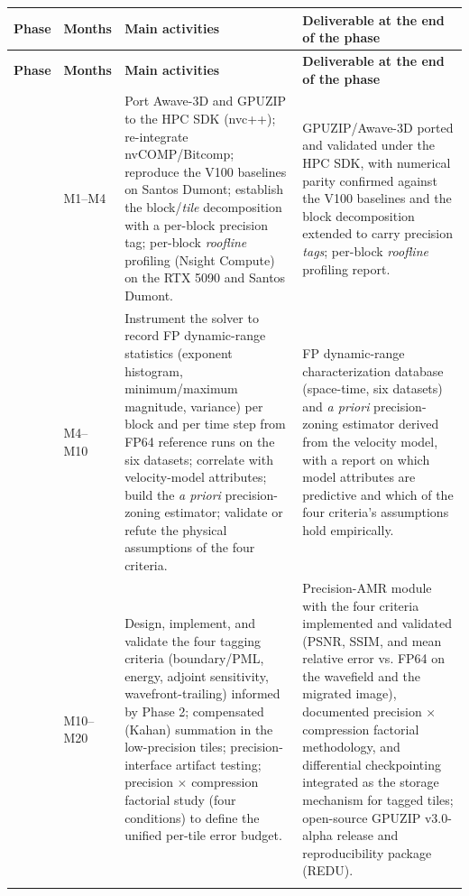 \documentclass[12pt,a4paper]{article}
\begin{document}
\begin{longtable}{@{}p{}p{}p{}p{}@{}}
\toprule
\textbf{Phase} & \textbf{Months} & \textbf{Main activities} &
\textbf{Deliverable at the end of the phase}\\
\midrule
\endfirsthead
\toprule
\textbf{Phase} & \textbf{Months} & \textbf{Main activities} &
\textbf{Deliverable at the end of the phase}\\
\midrule
\endhead
\bottomrule
\endfoot
1 & M1--M4 & Port Awave-3D and GPUZIP to the HPC SDK (nvc++); re-integrate
nvCOMP/Bitcomp; reproduce the V100 baselines on Santos Dumont; establish
the block/\emph{tile} decomposition with a per-block precision tag;
per-block \emph{roofline} profiling (Nsight Compute) on the RTX 5090 and
Santos Dumont. & GPUZIP/Awave-3D ported and validated under the HPC SDK,
with numerical parity confirmed against the V100 baselines and the block
decomposition extended to carry precision \emph{tags}; per-block
\emph{roofline} profiling report.\\
\addlinespace
2 & M4--M10 & Instrument the solver to record FP dynamic-range statistics
(exponent histogram, minimum/maximum magnitude, variance) per block and
per time step from FP64 reference runs on the six datasets; correlate with
velocity-model attributes; build the \emph{a priori} precision-zoning
estimator; validate or refute the physical assumptions of the four
criteria. & FP dynamic-range characterization database (space-time, six
datasets) and \emph{a priori} precision-zoning estimator derived from the
velocity model, with a report on which model attributes are predictive and
which of the four criteria's assumptions hold empirically.\\
\addlinespace
3 & M10--M20 & Design, implement, and validate the four tagging criteria
(boundary/PML, energy, adjoint sensitivity, wavefront-trailing) informed
by Phase 2; compensated (Kahan) summation in the low-precision tiles;
precision-interface artifact testing; precision $\times$ compression
factorial study (four conditions) to define the unified per-tile error
budget. & Precision-AMR module with the four criteria implemented and
validated (PSNR, SSIM, and mean relative error vs. FP64 on the wavefield
and the migrated image), documented precision $\times$ compression
factorial methodology, and differential checkpointing integrated as the
storage mechanism for tagged tiles; open-source GPUZIP v3.0-alpha release
and reproducibility package (REDU).\\
\addlinespace

\end{longtable}
\end{document}

